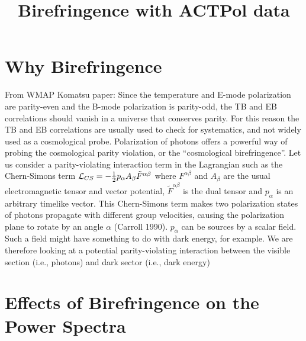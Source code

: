 \documentclass[a4paper, 11pt]{article}
\begin{document}
\title{Birefringence with ACTPol data}
\maketitle

\section{Why Birefringence}

From WMAP Komatsu paper:
Since the temperature and E-mode polarization are
parity-even and the B-mode polarization is parity-odd, the TB and EB correlations should vanish in a universe that conserves parity. For this reason the TB and EB correlations are usually used to check for systematics, and not widely used as a cosmological probe.
Polarization of photons offers a powerful way of probing the cosmological parity violation, or the “cosmological birefringence”. Let us consider a parity-violating interaction term in the Lagrangian such as the Chern-Simons term ${\cal L}_{CS}= -\frac{1}{2}p_{\alpha}A_{\beta}{\tilde F}^{\alpha \beta}$ where $F^{\alpha \beta}$ and $A_{\beta}$ are the usual electromagnetic tensor and vector potential, ${\tilde F}^{\alpha \beta}$ is the dual tensor and $p_{\alpha}$ is an arbitrary timelike vector. This Chern-Simons term makes two polarization states of photons propagate with different group velocities, causing the polarization plane to rotate by an angle $\alpha$ (Carroll 1990). $p_{\alpha}$ can be sources by a scalar field. Such a field might have something to do with dark energy, for example. We are therefore looking at a potential parity-violating interaction between the visible section (i.e., photons) and dark sector (i.e., dark energy)

\section{Effects of Birefringence on the Power Spectra}
\end{document}
